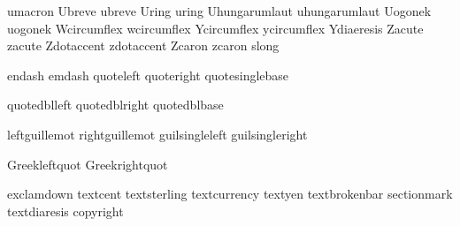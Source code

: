  umacron       {}
 Ubreve        {}
 ubreve        {}
 Uring         {}
 uring         {}
 Uhungarumlaut {}
 uhungarumlaut {}
 Uogonek       {}
 uogonek       {}
 Wcircumflex   {}
 wcircumflex   {}
 Ycircumflex   {}
 ycircumflex   {}
 Ydiaeresis    {}
 Zacute        {}
 zacute        {}
 Zdotaccent    {}
 zdotaccent    {}
 Zcaron        {}
 zcaron        {}
 slong         {}

\stopencoding

\startencoding[uc]

 endash          {}
 emdash          {}
 quoteleft       {}
 quoteright      {}
 quotesinglebase {}

 quotedblleft    {}
 quotedblright   {}
 quotedblbase    {}

 leftguillemot   {}
 rightguillemot  {}
 guilsingleleft  {}
 guilsingleright {}

\stopencoding


\startencoding[default]

 Greekleftquot  {\leftguillemot}
 Greekrightquot {\rightguillemot}

\stopencoding


\startencoding[uc]

 exclamdown     {}
 textcent       {}
 textsterling   {}
 textcurrency   {}
 textyen        {}
 textbrokenbar  {}
 sectionmark    {}
 textdiaresis   {}
 copyright      {}

